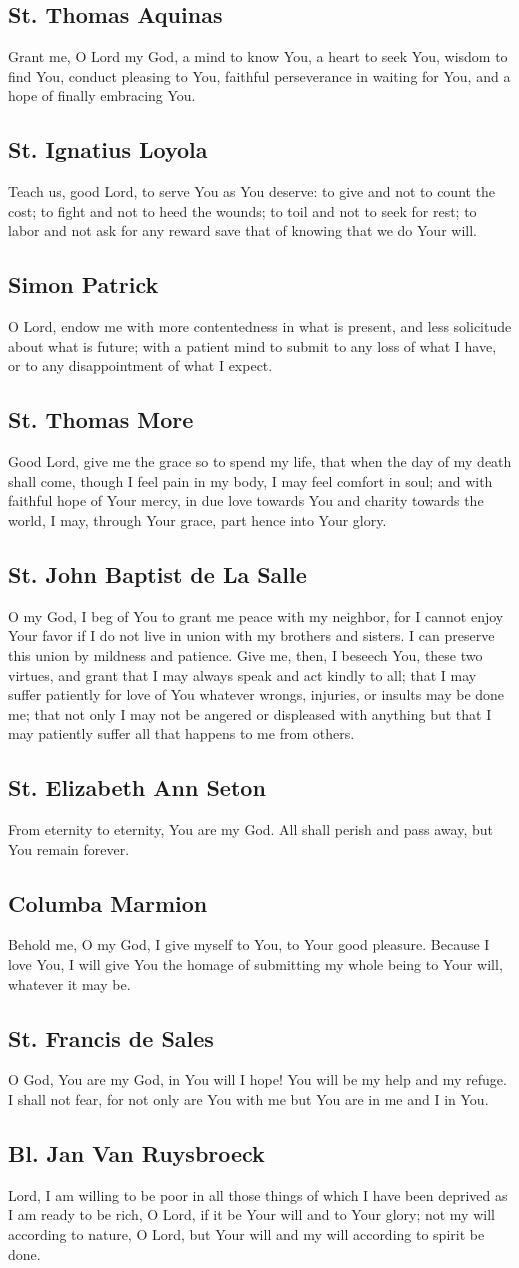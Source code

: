 \documentclass[12pt]{article}
\newcommand{\prayertitle}[1]{\subsection{#1}}
\begin{document}
\prayertitle{St. Thomas Aquinas}
Grant me, O Lord my God,
a mind to know You,
a heart to seek You,
wisdom to find You,
conduct pleasing to You,
faithful perseverance in waiting for You,
and a hope of finally embracing You.

\prayertitle{St. Ignatius Loyola}
Teach us, good Lord, to serve You as You deserve:
to give and not to count the cost;
to fight and not to heed the wounds;
to toil and not to seek for rest;
to labor and not ask for any reward save that of knowing that we do Your will.

\prayertitle{Simon Patrick}
O Lord, endow me with more contentedness in what is present, and less solicitude about what is future;
with a patient mind to submit to any loss of what I have, or to  any disappointment of what I expect.

\prayertitle{St. Thomas More}
Good Lord, give me the grace so to spend my life, that when the day of my death shall come, though I feel pain in my body, I may feel comfort in soul;
and with faithful hope of Your mercy, in due love towards You and charity towards the world, I may, through Your grace, part hence into Your glory.

\prayertitle{St. John Baptist de La Salle}
O my God, I beg of You to grant me peace with my neighbor, for I cannot enjoy Your favor if I do not live in union with my brothers and sisters.
I can preserve this union by mildness and patience.
Give me, then, I beseech You, these two virtues, and grant that I may always speak and act kindly to all;
that I may suffer patiently for love of You whatever wrongs, injuries, or insults may be done me;
that not only I may not be angered or displeased with anything but that I may patiently suffer all that happens to me from others.

\prayertitle{St. Elizabeth Ann Seton}
From eternity to eternity, You are my God.
All shall perish and pass away, but You remain forever.

\prayertitle{Columba Marmion}
Behold me, O my God, I give myself to You, to Your good pleasure.
Because I love You, I will give You the homage of submitting my whole being to Your will, whatever it may be.

\prayertitle{St. Francis de Sales}
O God, You are my God, in You will I hope!
You will be my help and my refuge.
I shall not fear, for not only are You with me but You are in me and I in You.
\newpage
\prayertitle{Bl. Jan Van Ruysbroeck}
Lord, I am willing to be poor in all those things of which I have been deprived as I am ready to be rich, O Lord, if it be Your will and to Your glory;
not my will according to nature, O Lord, but Your will and my will according to spirit be done.
\end{document}
